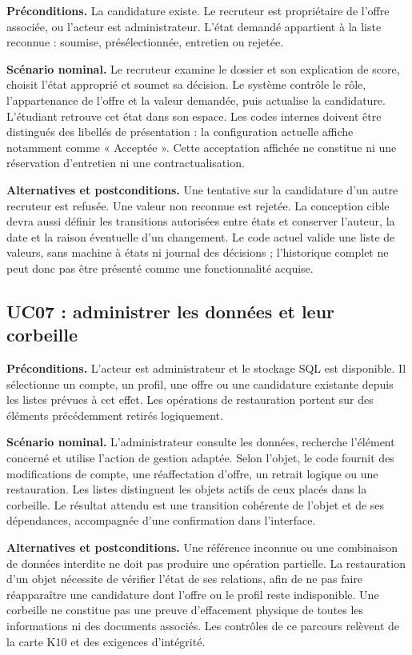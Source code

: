 \textbf{Préconditions.} La candidature existe. Le recruteur est propriétaire de l'offre associée, ou l'acteur est administrateur. L'état demandé appartient à la liste reconnue : soumise, présélectionnée, entretien ou rejetée.

\textbf{Scénario nominal.} Le recruteur examine le dossier et son explication de score, choisit l'état approprié et soumet sa décision. Le système contrôle le rôle, l'appartenance de l'offre et la valeur demandée, puis actualise la candidature. L'étudiant retrouve cet état dans son espace. Les codes internes doivent être distingués des libellés de présentation : la configuration actuelle affiche notamment  comme « Acceptée ». Cette acceptation affichée ne constitue ni une réservation d'entretien ni une contractualisation.

\textbf{Alternatives et postconditions.} Une tentative sur la candidature d'un autre recruteur est refusée. Une valeur non reconnue est rejetée. La conception cible devra aussi définir les transitions autorisées entre états et conserver l'auteur, la date et la raison éventuelle d'un changement. Le code actuel valide une liste de valeurs, sans machine à états ni journal des décisions ; l'historique complet ne peut donc pas être présenté comme une fonctionnalité acquise.

\subsection{UC07 : administrer les données et leur corbeille}

\textbf{Préconditions.} L'acteur est administrateur et le stockage SQL est disponible. Il sélectionne un compte, un profil, une offre ou une candidature existante depuis les listes prévues à cet effet. Les opérations de restauration portent sur des éléments précédemment retirés logiquement.

\textbf{Scénario nominal.} L'administrateur consulte les données, recherche l'élément concerné et utilise l'action de gestion adaptée. Selon l'objet, le code fournit des modifications de compte, une réaffectation d'offre, un retrait logique ou une restauration. Les listes distinguent les objets actifs de ceux placés dans la corbeille. Le résultat attendu est une transition cohérente de l'objet et de ses dépendances, accompagnée d'une confirmation dans l'interface.

\textbf{Alternatives et postconditions.} Une référence inconnue ou une combinaison de données interdite ne doit pas produire une opération partielle. La restauration d'un objet nécessite de vérifier l'état de ses relations, afin de ne pas faire réapparaître une candidature dont l'offre ou le profil reste indisponible. Une corbeille ne constitue pas une preuve d'effacement physique de toutes les informations ni des documents associés. Les contrôles de ce parcours relèvent de la carte K10 et des exigences d'intégrité.

